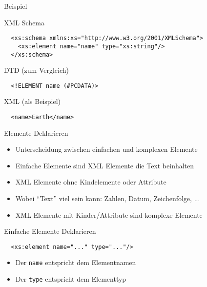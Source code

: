 \documentclass{beamer}
\begin{document}
\begin{frame}[fragile]{Beispiel}
	
	XML Schema
	\lstset{language=XML}
	\begin{lstlisting}	
  <xs:schema xmlns:xs="http://www.w3.org/2001/XMLSchema">
    <xs:element name="name" type="xs:string"/>
  </xs:schema>	
	\end{lstlisting}	

	\vspace{0.5cm}
	
	DTD (zum Vergleich)
	\begin{lstlisting}
  <!ELEMENT name (#PCDATA)>	
	\end{lstlisting}
  
	\vspace{0.5cm}
  
    XML (als Beispiel)
   	\begin{lstlisting}	
  <name>Earth</name>
    \end{lstlisting}
	
\end{frame}

\begin{frame}{Elemente Deklarieren}
	
	\begin{itemize}
		\item Unterscheidung zwischen einfachen und komplexen Elemente
		\item Einfache Elemente sind XML Elemente die Text beinhalten
		\item XML Elemente ohne Kindelemente oder Attribute
		\item Wobei ``Text'' viel sein kann: Zahlen, Datum, Zeichenfolge, ... 
		\item XML Elemente mit Kinder/Attribute sind komplexe Elemente
	\end{itemize}
	
\end{frame}

\begin{frame}[fragile]{Einfache Elemente Deklarieren}
	
	\lstset{language=XML}
	\begin{lstlisting}	
  <xs:element name="..." type="..."/>
    \end{lstlisting}
	
	\begin{itemize}
		\item Der \texttt{name} entspricht dem Elementnamen
		\item Der \texttt{type} entspricht dem Elementtyp
	\end{itemize}
	
\end{frame}
\end{document}
